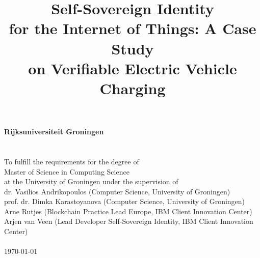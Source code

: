 \documentclass[a4paper,10pt,twoside]{article}
\begin{document}
\pagestyle{body}



\title{
    \vspace{5cm}
        {\bf
        {\Huge Self-Sovereign Identity\\
        \vspace{2mm}for the Internet of Things: A Case Study\\
        \vspace{4mm}on Verifiable Electric Vehicle Charging}
        }\\
        \vspace{10cm}{\LARGE Filipe Alexandre Rosa Capela}
}
\date{}

\maketitle
\thispagestyle{titlepage}

\newpage

\thispagestyle{titlepage}

\vspace*{4cm}

\begin{center}
    {\bf{\large Rijksuniversiteit Groningen}}\\
    \\
    \vspace{2cm}{\bf Master's Thesis}\\
    \vspace{0.5cm}To fulfill the requirements for the degree of\\Master of Science in Computing Science\\
    at the University of Groningen under the supervision of\\
    \vspace{0.5cm}
    dr. Vasilios Andrikopoulos (Computer Science, University of Groningen)\\
    prof. dr. Dimka Karastoyanova (Computer Science, University of Groningen)\\
    Arne Rutjes (Blockchain Practice Lead Europe, IBM Client Innovation Center)\\
    Arjen van Veen (Lead Developer Self-Sovereign Identity, IBM Client Innovation Center)\\
    
    \vspace{3cm}{\bf Filipe Alexandre Rosa Capela (s4040112)}\\
    \vspace{4cm}\today
    
\end{center}
\end{document}
